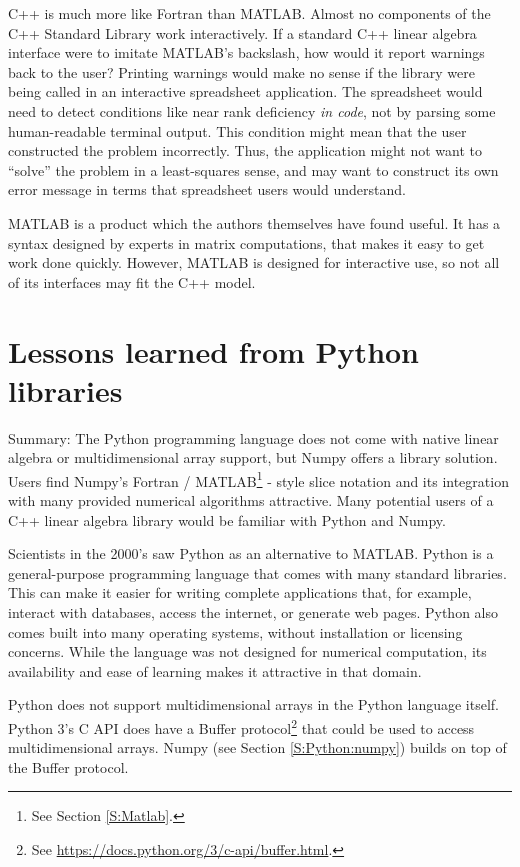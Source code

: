 C++ is much more like Fortran than MATLAB.  Almost no components of
the C++ Standard Library work interactively.  If a standard C++ linear
algebra interface were to imitate MATLAB's backslash, how would it
report warnings back to the user?  Printing warnings would make no
sense if the library were being called in an interactive spreadsheet
application.  The spreadsheet would need to detect conditions like
near rank deficiency \emph{in code}, not by parsing some
human-readable terminal output.  This condition might mean that the
user constructed the problem incorrectly.  Thus, the application might
not want to ``solve'' the problem in a least-squares sense, and may
want to construct its own error message in terms that spreadsheet
users would understand.

MATLAB is a product which the authors themselves have found useful.
It has a syntax designed by experts in matrix computations, that makes
it easy to get work done quickly.  However, MATLAB is designed for
interactive use, so not all of its interfaces may fit the C++ model.

\section{Lessons learned from Python libraries}
\label{S:Python}

Summary: The Python programming language does not come with native
linear algebra or multidimensional array support, but Numpy offers a
library solution.  Users find Numpy's Fortran / MATLAB\footnote{See
  Section \ref{S:Matlab}.} - style slice notation and its integration
with many provided numerical algorithms attractive.  Many potential
users of a C++ linear algebra library would be familiar with Python
and Numpy.

Scientists in the 2000's saw Python as an alternative to MATLAB.
Python is a general-purpose programming language that comes with many
standard libraries.  This can make it easier for writing complete
applications that, for example, interact with databases, access the
internet, or generate web pages.  Python also comes built into many
operating systems, without installation or licensing concerns.  While
the language was not designed for numerical computation, its
availability and ease of learning makes it attractive in that domain.

Python does not support multidimensional arrays in the Python language
itself.  Python 3's C API does have a Buffer protocol\footnote{See
  \url{https://docs.python.org/3/c-api/buffer.html}.} that could be
used to access multidimensional arrays.  Numpy (see Section
\ref{S:Python:numpy}) builds on top of the Buffer protocol.

